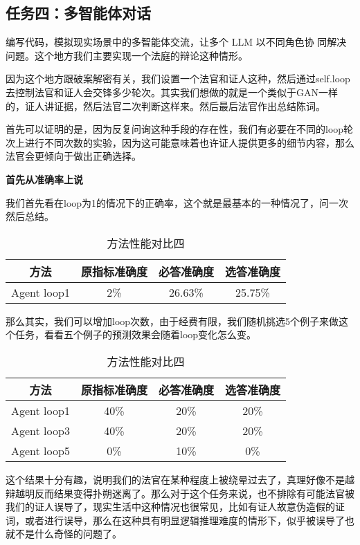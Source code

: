 \documentclass[answers]{exam}  %
\begin{document}
\subsection{任务四：多智能体对话}

编写代码，模拟现实场景中的多智能体交流，让多个 LLM 以不同角色协
同解决问题。这个地方我们主要实现一个法庭的辩论这种情形。

因为这个地方跟破案解密有关，我们设置一个法官和证人这种，然后通过self.loop去控制法官和证人会交锋多少轮次。其实我们想做的就是一个类似于GAN一样的，证人讲证据，然后法官二次判断这样来。然后最后法官作出总结陈词。

首先可以证明的是，因为反复问询这种手段的存在性，我们有必要在不同的loop轮次上进行不同次数的实验，因为这可能意味着也许证人提供更多的细节内容，那么法官会更倾向于做出正确选择。

\textbf{首先从准确率上说}

我们首先看在loop为1的情况下的正确率，这个就是最基本的一种情况了，问一次然后总结。

\begin{table}[h]
    \centering
    \begin{tabular}{cccc}
    \toprule
    \textbf{方法} & \textbf{原指标准确度} & \textbf{必答准确度} &\textbf{选答准确度}\\
    \midrule
    Agent loop1 & 2\% & 26.63\% & 25.75\% \\
    \bottomrule
    \end{tabular}
    \caption{方法性能对比四}
\end{table}

那么其实，我们可以增加loop次数，由于经费有限，我们随机挑选5个例子来做这个任务，看看五个例子的预测效果会随着loop变化怎么变。

\begin{table}[h]
    \centering
    \begin{tabular}{cccc}
    \toprule
    \textbf{方法} & \textbf{原指标准确度} & \textbf{必答准确度} &\textbf{选答准确度}\\
    \midrule
    Agent loop1 & 40\% & 20\% & 20\% \\
    \hline
    Agent loop3 & 40\% & 20\% & 20\% \\
    \hline
    Agent loop5 & 0\% & 10\% & 0\% \\
    \bottomrule
    \end{tabular}
    \caption{方法性能对比四}
\end{table}

这个结果十分有趣，说明我们的法官在某种程度上被绕晕过去了，真理好像不是越辩越明反而结果变得扑朔迷离了。那么对于这个任务来说，也不排除有可能法官被我们的证人误导了，现实生活中这种情况也很常见，比如有证人故意伪造假的证词，或者进行误导，那么在这种具有明显逻辑推理难度的情形下，似乎被误导了也就不是什么奇怪的问题了。
\end{document}
